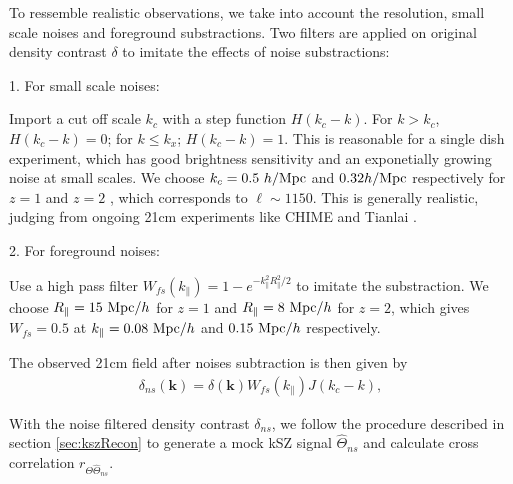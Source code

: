 To ressemble realistic observations, we take into account the resolution, small scale noises and foreground substractions. 
Two filters are applied on original density contrast $\delta$ to imitate the effects of noise substractions:

1. For small scale noises:

Import a cut off scale $k_c$ 
with a step function $H(k_c-k)$. 
For $k>k_c$, $H(k_c-k)=0$; for $k\leqslant k_x$; $H(k_c-k)=1$.
This is reasonable for a single dish experiment, which
has good brightness sensitivity and an exponetially growing noise at small 
scales.
We choose $k_c=0.5\ h/\mathrm{Mpc}$ and $0.32 h/\mathrm{Mpc}$ respectively for $z=1$ and $z=2$ , which corresponds
to $\ell\sim1150$. 
This is generally realistic, judging from ongoing 21cm experiments like
CHIME \cite{2014SPIE.9145E..22B}\cite{2014SPIE.9145E..4VN}
and Tianlai \cite{2012IJMPS..12..256C}\cite{2015ApJ...798...40X}.

2. For foreground noises:

Use a high pass filter $W_{fs}(k_\parallel)=1-e^{-k_\parallel^2R_\parallel^2/2}$ to imitate the substraction. 
We choose 
$R_\parallel=15\ \mathrm{Mpc}/h$ for $z=1$ and $R_\parallel=8\ \mathrm{Mpc}/h$ for $z=2$, which gives
$W_{fs}=0.5$ at
$k_\parallel=0.08\ \mathrm{Mpc}/h$ and $0.15\ \mathrm{Mpc}/h$ respectively. 

The observed 21cm field after noises subtraction is then given by 
\begin{eqnarray}
\label{eq:ns}
\delta_{ns}(\bm{k})=\delta(\bm{k})W_{fs}(k_\parallel)J(k_c-k),
\end{eqnarray}

With the noise filtered density contrast $\delta_{ns}$, we follow the procedure described in 
section \ref{sec:kszRecon} to generate a mock kSZ signal $\hat \Theta_{ns}$  
and calculate cross correlation $r_{\Theta\hat\Theta_{ns}}$.
